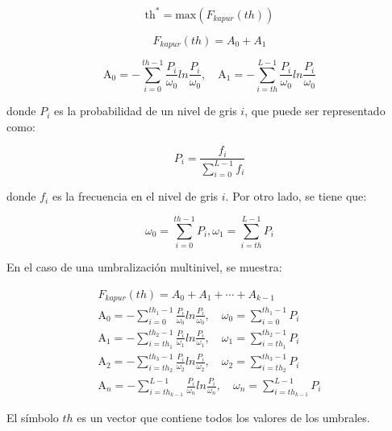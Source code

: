 \documentclass[conference]{IEEEtran}
\begin{document}
\begin{equation}
	\text{th}^* = \text{max}(F_{kapur}(th))
	\label{eq3}
\end{equation}

\begin{equation}
	F_{kapur}(th) = A_0 + A_1
	\label{eq4}
\end{equation}

\begin{equation}
	\text{A}_0 = - \sum_{i=0}^{th-1} \frac{P_i}{\omega_0} ln\frac{P_i}{\omega_0}, \quad \text{A}_1 = - \sum_{i=th}^{L-1} \frac{P_i}{\omega_0} ln\frac{P_i}{\omega_0}
	\label{eq5}
\end{equation}

\noindent donde $P_i$ es la probabilidad de un nivel de gris $i$, que puede ser representado como:

\begin{equation}
	P_i =\frac{f_i}{\sum_{i=0}^{L-1} f_i}   
	\label{eq6}
\end{equation}

\noindent donde $f_i$ es la frecuencia en el nivel de gris $i$. Por otro lado, se tiene que:

\begin{equation}
	\omega_0 = \sum_{i=0}^{th-1} P_i ,   \omega_1 = \sum_{i=th}^{L-1} P_i
	\label{eq7}
\end{equation}

\noindent En el caso de una umbralización multinivel, se muestra:

\begin{equation}
	\begin{gathered}
		F_{kapur}(th) = A_0 + A_1 + \cdots + A_{k-1} \\
		\text{A}_0 = - \sum_{i=0}^{th_1-1} \frac{P_i}{\omega_0} ln\frac{P_i}{\omega_0}, \quad \omega_0 = \sum_{i=0}^{th_1-1} P_i  \\
		\text{A}_1 = - \sum_{i=th_1}^{th_{2}-1} \frac{P_i}{\omega_1} ln\frac{P_i}{\omega_1}, \quad \omega_1 = \sum_{i=th_1}^{th_{2}-1} P_i \\
		\text{A}_2 = - \sum_{i=th_2}^{th_{3}-1} \frac{P_i}{\omega_2} ln\frac{P_i}{\omega_2}, \quad \omega_2 = \sum_{i=th_2}^{th_{3}-1} P_i \\
		\text{A}_n = - \sum_{i=th_{k-1}}^{L-1} \frac{P_i}{\omega_n} ln\frac{P_i}{\omega_n}, \quad \omega_n = \sum_{i=th_{k-1}}^{L-1} P_i 
	\end{gathered}
	\label{eq8}
\end{equation}

\noindent El símbolo $th$ es un vector que contiene todos los valores de los umbrales.
\end{document}
